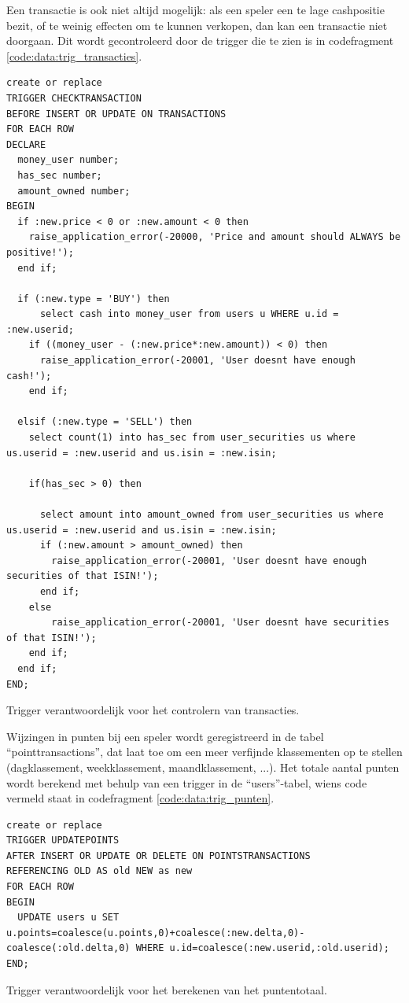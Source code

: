 Een transactie is ook niet altijd mogelijk: als een speler een te lage cashpositie bezit, of te weinig effecten om te kunnen verkopen, dan kan een transactie niet doorgaan. Dit wordt gecontroleerd door de trigger die te zien is in codefragment \ref{code:data:trig_transacties}.

\begin{code}
\lstset{language=SQL,style=SQL}
\begin{lstlisting}
create or replace
TRIGGER CHECKTRANSACTION
BEFORE INSERT OR UPDATE ON TRANSACTIONS 
FOR EACH ROW 
DECLARE
  money_user number;
  has_sec number;
  amount_owned number;
BEGIN
  if :new.price < 0 or :new.amount < 0 then
    raise_application_error(-20000, 'Price and amount should ALWAYS be positive!');
  end if;
    
  if (:new.type = 'BUY') then
      select cash into money_user from users u WHERE u.id = :new.userid;
    if ((money_user - (:new.price*:new.amount)) < 0) then
      raise_application_error(-20001, 'User doesnt have enough cash!');
    end if;

  elsif (:new.type = 'SELL') then
    select count(1) into has_sec from user_securities us where us.userid = :new.userid and us.isin = :new.isin;
    
    if(has_sec > 0) then 
    
      select amount into amount_owned from user_securities us where us.userid = :new.userid and us.isin = :new.isin;
      if (:new.amount > amount_owned) then
        raise_application_error(-20001, 'User doesnt have enough securities of that ISIN!');
      end if;
    else
        raise_application_error(-20001, 'User doesnt have securities of that ISIN!');
    end if;
  end if;
END;
\end{lstlisting}
\caption{Trigger verantwoordelijk voor het controlern van transacties.}
\label{code:data:trig_transacties}
\end{code}


Wijzingen in punten bij een speler wordt geregistreerd in de tabel ``pointtransactions'', dat laat toe om een meer verfijnde klassementen op te stellen (dagklassement, weekklassement, maandklassement, ...). Het totale aantal punten wordt berekend met behulp van een trigger in de ``users''-tabel, wiens code vermeld staat in codefragment \ref{code:data:trig_punten}.

\begin{code}
\lstset{language=SQL,style=SQL}
\begin{lstlisting}
create or replace
TRIGGER UPDATEPOINTS
AFTER INSERT OR UPDATE OR DELETE ON POINTSTRANSACTIONS 
REFERENCING OLD AS old NEW as new
FOR EACH ROW 
BEGIN
  UPDATE users u SET u.points=coalesce(u.points,0)+coalesce(:new.delta,0)-coalesce(:old.delta,0) WHERE u.id=coalesce(:new.userid,:old.userid);
END;
\end{lstlisting}
\caption{Trigger verantwoordelijk voor het berekenen van het puntentotaal.}
\label{code:data:trig_punten}
\end{code}

